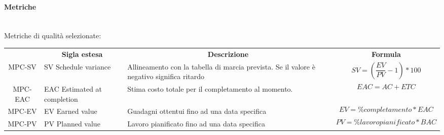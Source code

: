 \paragraph{Metriche}\mbox{}\\
Metriche di qualità selezionate:
\begin{table}[H]
    \centering
    \renewcommand{\arraystretch}{1.4}
    \begin{tabular}{| c | p{3cm} | p{4cm} |p{2cm} | }
        \rowcolor[HTML]{a52a2a}
        \multicolumn{1}{c}{\color[HTML]{FFFFFF} \textbf{Codice}}       &
        \multicolumn{1}{c}{\color[HTML]{FFFFFF} \textbf{Sigla estesa}} &
        \multicolumn{1}{c}{\color[HTML]{FFFFFF} \textbf{Descrizione}}  &
        \multicolumn{1}{c}{\color[HTML]{FFFFFF} \textbf{Formula}}                                                                                                                                                                                                                              \\
        MPC-SV                                                         & SV Schedule variance            & Allineamento con la tabella di marcia prevista. Se il valore è negativo significa ritardo & \begin{equation}SV =(\frac{EV}{PV}-1) * 100\end{equation}                               \\
        MPC-EAC                                                        & EAC Estimated at completion     & Stima costo totale per il completamento al momento.                                       & \begin{equation}EAC = AC + ETC                 \end{equation}                           \\
        MPC-EV                                                         & EV Earned value                 & Guadagni ottentui fino ad una data specifica                                              & \begin{equation}EV = \% completamento * EAC    \end{equation}                           \\
        MPC-PV                                                         & PV Planned value                & Lavoro pianificato fino ad una data specifica                                             & \begin{equation}PV=\% lavoro pianificato *BAC   \end{equation}                          \\

\end{tabular}
\end{table}
